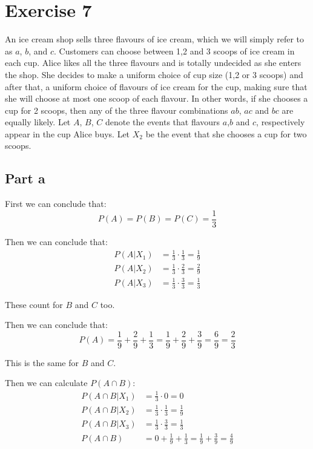 \section{Exercise 7}
An ice cream shop sells three flavours of ice cream, which we will simply refer to as $a$, $b$, and $c$. Customers can choose between 1,2 and 3 scoops of ice cream in each cup. Alice likes all the three flavours and is totally undecided as she enters the shop. She decides to make a uniform choice of cup size (1,2 or 3 scoops) and after that, a uniform choice of flavours of ice cream for the cup, making sure that she will choose at most one scoop of each flavour. In other words, if she chooses a cup for 2 scoops, then any of the three flavour combinations $ab$, $ac$ and $bc$ are equally likely. Let $A$, $B$, $C$ denote the events that flavours $a$,$b$ and $c$, respectively appear in the cup Alice buys. Let $X_2$ be the event that she chooses a cup for two scoops.

\subsection{Part a}

First we can conclude that:
\[
	P(A) = P(B) = P(C) = \frac{1}{3}
\]

Then we can conclude that:
\begin{align*}
	P(A|X_1) & = \frac{1}{3} \cdot \frac{1}{3} = \frac{1}{9} \\
	P(A|X_2) & = \frac{1}{3} \cdot \frac{2}{3} = \frac{2}{9} \\
	P(A|X_3) & = \frac{1}{3} \cdot \frac{3}{3} = \frac{1}{3}
\end{align*}

These count for $B$ and $C$ too.

Then we can conclude that:
\[
	P(A) = \frac{1}{9} + \frac{2}{9} + \frac{1}{3} = \frac{1}{9} + \frac{2}{9} + \frac{3}{9} = \frac{6}{9} = \frac{2}{3}
\]

This is the same for $B$ and $C$.

Then we can calculate $P(A \cap B)$:
\begin{align*}
	P(A\cap B|X_1) & = \frac{1}{3} \cdot 0 = 0                                                 \\
	P(A\cap B|X_2) & = \frac{1}{3} \cdot \frac{1}{3} = \frac{1}{9}                             \\
	P(A\cap B|X_3) & = \frac{1}{3} \cdot \frac{3}{3} = \frac{1}{3}                             \\
	P(A \cap B)    & = 0 + \frac{1}{9} + \frac{1}{3} = \frac{1}{9} + \frac{3}{9} = \frac{4}{9}
\end{align*}

